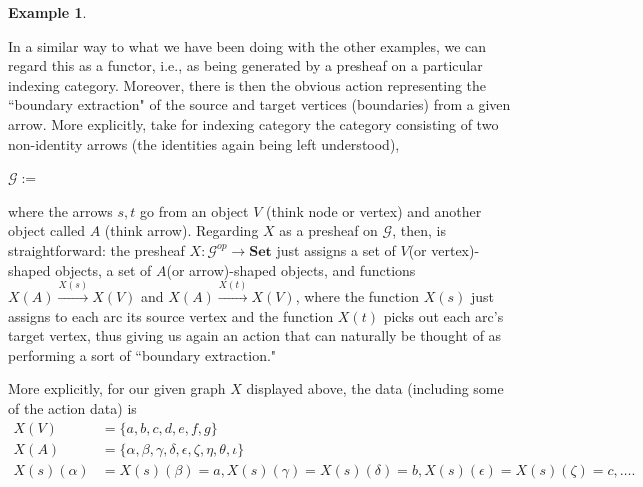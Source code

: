 \documentclass[11pt]{book}
\theoremstyle{definition}
\newtheorem{example}{Example}[section]
\theoremstyle{definition}
\theoremstyle{definition}
\theoremstyle{theorem}
\theoremstyle{definition}
\begin{document}
\begin{example}
\begin{center}
			\end{center} 
			In a similar way to what we have been doing with the other examples, we can regard this as a functor, i.e., as being generated by a presheaf on a particular indexing category. Moreover, there is then the obvious action representing the ``boundary extraction" of the source and target vertices (boundaries) from a given arrow. More explicitly, take for indexing category the category consisting of two non-identity arrows (the identities again being left understood),
			\begin{center} 
				$\mathcal{G} :=$ 
			\end{center} 
			where the arrows $s,t$ go from an object $V$ (think node or vertex) and another object called $A$ (think arrow). Regarding $X$ as a presheaf on $\mathcal{G}$, then, is straightforward: the presheaf $X: \mathcal{G}^{op} \rightarrow \textbf{Set}$ just assigns a set of $V$(or vertex)-shaped objects, a set of $A$(or arrow)-shaped objects, and functions $X(A) \xrightarrow{X(s)} X(V)$ and $X(A) \xrightarrow{X(t)} X(V)$, where the function $X(s)$ just assigns to each arc its source vertex and the function $X(t)$ picks out each arc's target vertex, thus giving us again an action that can naturally be thought of as performing a sort of ``boundary extraction." \par 
			More explicitly, for our given graph $X$ displayed above, the data (including some of the action data) is 
			\begin{equation*}
			\begin{split}
			X(V) & = \{a,b,c,d,e,f,g\} \\ 
			X(A) & = \{\alpha, \beta, \gamma, \delta, \epsilon, \zeta, \eta, \theta, \iota\} \\ 
			X(s)(\alpha) & = X(s)(\beta) = a , X(s)(\gamma) = X(s)(\delta) = b , X(s)(\epsilon) = X(s)(\zeta) = c, \dots . 
			\end{split}
			\end{equation*}

\end{example}
\end{document}

